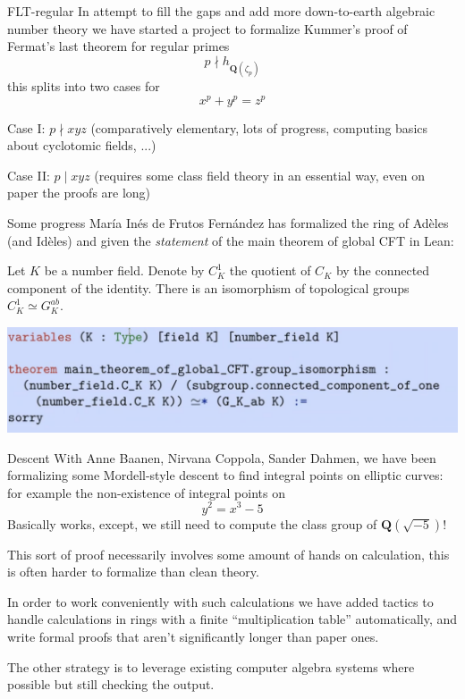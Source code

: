 \documentclass{beamer}
\theoremstyle{plain}
\newcommand{\QQ}{\mathbf Q}
\begin{document}
\begin{frame}{FLT-regular}
    In attempt to fill the gaps and add more down-to-earth algebraic number theory we have started a project to formalize Kummer's proof of Fermat's last theorem for regular primes
    $$p \nmid h_{\QQ(\zeta_p)}$$
    this splits into two cases for
    $$x^p + y^p = z^p$$

    Case I: $p\nmid xyz$ (comparatively elementary, lots of progress, computing basics about cyclotomic fields, ...)

    Case II: $p\mid xyz$ (requires some class field theory in an essential way, even on paper the proofs are long)
\end{frame}

\begin{frame}{Some progress}
    María Inés de Frutos Fernández has formalized the ring of Adèles (and Idèles) and given the \emph{statement} of the main theorem of global CFT in Lean:
    \begin{theorem}
        Let $K$ be a number field. Denote by $C_{K}^{1}$ the quotient of $C_{K}$ by the connected component of the identity. There is an isomorphism of topological groups $C_{K}^{1} \simeq G_{K}^{a b}$.
    \end{theorem}
    \includegraphics[width=\textwidth]{maria.png}
\end{frame}

\begin{frame}{Descent}
    With Anne Baanen, Nirvana Coppola, Sander Dahmen, we have been formalizing some Mordell-style descent to find integral points on elliptic curves: for example the non-existence of integral points on
    $$y^2 = x^3 - 5$$\pause
    Basically works, except, we still need to compute the class group of $\QQ(\sqrt{-5})$!

    This sort of proof necessarily involves some amount of hands on calculation, this is often harder to formalize than clean theory. %

    In order to work conveniently with such calculations we have added tactics to handle calculations in rings with a finite ``multiplication table'' automatically, and write formal proofs that aren't significantly longer than paper ones.

    The other strategy is to leverage existing computer algebra systems where possible but still checking the output.
\end{frame}
\end{document}
